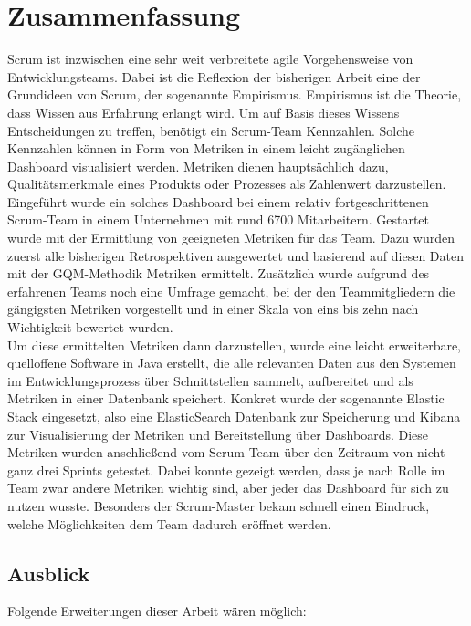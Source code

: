 \chapter{Zusammenfassung}

Scrum ist inzwischen eine sehr weit verbreitete agile Vorgehensweise von Entwicklungsteams.
Dabei ist die Reflexion der bisherigen Arbeit eine der Grundideen von Scrum, der sogenannte Empirismus.
Empirismus ist die Theorie, dass Wissen aus Erfahrung erlangt wird.
Um auf Basis dieses Wissens Entscheidungen zu treffen, benötigt ein Scrum-Team Kennzahlen.
Solche Kennzahlen können in Form von Metriken in einem leicht zugänglichen Dashboard visualisiert werden.
Metriken dienen hauptsächlich dazu, Qualitätsmerkmale eines Produkts oder Prozesses als Zahlenwert darzustellen.
\\
Eingeführt wurde ein solches Dashboard bei einem relativ fortgeschrittenen Scrum-Team in einem Unternehmen mit rund 6700 Mitarbeitern.
Gestartet wurde mit der Ermittlung von geeigneten Metriken für das Team.
Dazu wurden zuerst alle bisherigen Retrospektiven ausgewertet und basierend auf diesen Daten mit der \ac{GQM}-Methodik Metriken ermittelt.
Zusätzlich wurde aufgrund des erfahrenen Teams noch eine Umfrage gemacht, bei der den Teammitgliedern die gängigsten Metriken vorgestellt und in einer Skala von eins bis zehn nach Wichtigkeit bewertet wurden.
\\
Um diese ermittelten Metriken dann darzustellen, wurde eine leicht erweiterbare, quelloffene Software in Java erstellt, die alle relevanten Daten aus den Systemen im Entwicklungsprozess über Schnittstellen sammelt, aufbereitet und als Metriken in einer Datenbank speichert.
Konkret wurde der sogenannte Elastic Stack eingesetzt, also eine ElasticSearch Datenbank zur Speicherung und Kibana zur Visualisierung der Metriken und Bereitstellung über Dashboards.
Diese Metriken wurden anschließend vom Scrum-Team über den Zeitraum von nicht ganz drei Sprints getestet.
Dabei konnte gezeigt werden, dass je nach Rolle im Team zwar andere Metriken wichtig sind, aber jeder das Dashboard für sich zu nutzen wusste.
Besonders der Scrum-Master bekam schnell einen Eindruck, welche Möglichkeiten dem Team dadurch eröffnet werden.

\section*{Ausblick}

Folgende Erweiterungen dieser Arbeit wären möglich:

